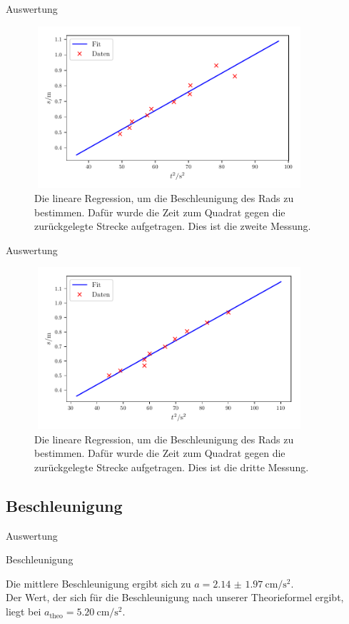 \begin{frame}{Auswertung}
    \begin{figure}   
    
    \centering
    \includegraphics[width=10cm, height=6cm]{build/plot2b.pdf}
    \caption{Die lineare Regression, um die Beschleunigung des Rads zu bestimmen. Dafür wurde die Zeit zum Quadrat gegen die zurückgelegte Strecke aufgetragen. Dies ist die zweite Messung.} 

    \label{fig:plot2b}
\end{figure}
\end{frame}

\begin{frame}{Auswertung}
    \begin{figure}   
    
    \centering
    \includegraphics[width=10cm, height=6cm]{build/plot3b.pdf}
    \caption{Die lineare Regression, um die Beschleunigung des Rads zu bestimmen. Dafür wurde die Zeit zum Quadrat gegen die zurückgelegte Strecke aufgetragen. Dies ist die dritte Messung.} 

    \label{fig:plot3b}
\end{figure}
\end{frame}

\subsection{Beschleunigung}
\begin{frame}{Auswertung}
    \begin{block}{Beschleunigung}
        
        Die mittlere Beschleunigung ergibt sich zu $a = \SI{2.14(197)}{\centi\meter\per\second\squared}$.
        \\Der Wert, der sich für die Beschleunigung nach unserer Theorieformel ergibt, liegt bei $a_\text{theo}= \SI{5.20}{\centi\meter\per\second\squared}$.
    \end{block}
\end{frame}
    
